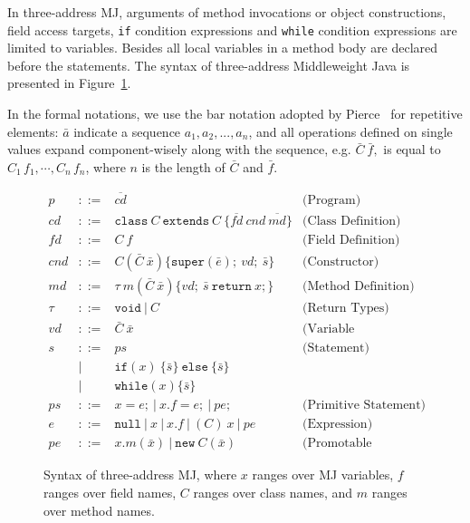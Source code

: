 \documentclass[letterpaper, USenglish]{lipics-v2016}
\newenvironment{smpage}[1]
{\begin{lrbox}{\fmbox}\begin{minipage}{#1}}
{\end{minipage}\end{lrbox}\usebox{\fmbox}}
\newcommand{\code}[1]{\texttt{\footnotesize #1}}
\theoremstyle{plain}
\begin{document}
In three-address MJ, arguments of method invocations or object constructions, field access targets, \code{if} condition expressions and \code{while} condition expressions are limited to variables. Besides all local variables in a method body are declared before the statements.
The syntax of three-address Middleweight Java is presented in
Figure~\ref{mj-syntax}. 

In the formal notations, we use the bar notation adopted by Pierce~\cite{Pierce:2002:TPL:509043}
for repetitive elements: $\bar{a}$ indicate a sequence $a_1,a_2,...,a_n$, 
and all operations defined on single values expand
component-wisely along with the sequence, e.g. $\bar{C}\ \bar{f},$ is equal to $C_{1}\,f_{1},\cdots,
C_{n}\,f_{n}$, where $n$ is the length of $\bar{C}$ and $\bar{f}$.

\begin{figure}[ht!]\footnotesize
\begin{center}
\begin{smpage}{0.7\columnwidth}
\[
\begin{array}{ccll}
p   &::=& \overline{\mathit{cd}}& \text{(Program)} \\
\mathit{cd}   &::=& \mathtt{class}~C~\mathtt{extends}~C~\{\overline{\mathit{fd}}~cnd~\overline{\mathit{md}}\} & \text{(Class Definition)}\\
\mathit{fd}   &::=& C~f & \text{(Field Definition)}\\
\mathit{cnd} &::=& C(\bar{C}~\bar{x})\{\mathtt{super}(\bar{e});~\mathit{vd};~\bar{s}\} & \text{(Constructor)}\\
\mathit{md}   &::=& \tau~m(\bar{C}~\bar{x})\{vd;~\bar{s}~\mathtt{return}~x;\} & \text{(Method Definition)}\\
\tau &::=& \mathtt{void} ~|~ C & \text{(Return Types)}\\
\mathit{vd} &::=& \bar{C}~\bar{x} & \text{(Variable Declaration)}\\
s &::=& \mathit{ps} & \text{(Statement)}\\
  & | & \mathtt{if}(x)~\{\bar{s}\}~\mathtt{else}~\{\bar{s}\}\\
  & | & \mathtt{while}(x)\{\bar{s}\} \\
\mathit{ps}   &::=& x=e; ~|~ x.f=e; ~|~ \mathit{pe}; & \text{(Primitive Statement})\\
e   &::=& \mathtt{null} ~|~ x ~|~ x.f ~|~ (C)~x ~|~ \mathit{pe} & \text{(Expression)}\\
\mathit{pe}   &::=& x.m(\bar{x}) ~|~ \mathtt{new}~C(\bar{x}) & \text{(Promotable Expression)}
\end{array}
\]
\end{smpage}
\end{center}
\vspace{-10pt}
\caption{Syntax of three-address MJ, where $x$ ranges over MJ variables, $f$ ranges over field names, $C$
ranges over class names, and $m$ ranges over method names.}
\label{mj-syntax}
\end{figure}
\vspace{-15pt}
\end{document}
